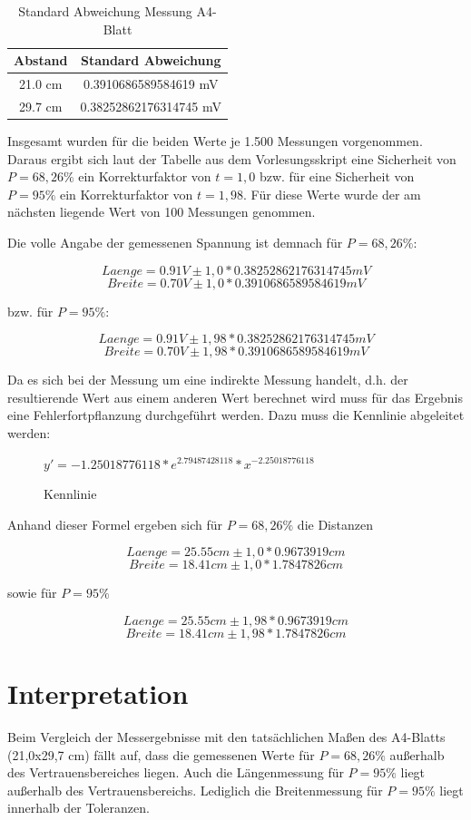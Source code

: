 \documentclass[12pt,oneside,a4paper]{report}
\begin{document}
\begin{table}[H]
	\centering\small
	\begin{tabular}{|c|c|}
		\hline
		Abstand & Standard Abweichung \\
		\hline
		21.0 cm & 0.3910686589584619 mV \\
		\hline
		29.7 cm & 0.38252862176314745 mV \\
		\hline
	\end{tabular}
	\caption{Standard Abweichung Messung A4-Blatt}
	\label{fig:VERSUCH_3_AUSWERTUNG_TABELLE}
\end{table}

Insgesamt wurden für die beiden Werte je 1.500 Messungen vorgenommen. Daraus ergibt sich laut der Tabelle aus dem Vorlesungsskript eine Sicherheit von \(P = 68,26\%\) ein Korrekturfaktor von \(t = 1,0\) bzw. für eine Sicherheit von \(P = 95\%\) ein Korrekturfaktor von \(t = 1,98\). Für diese Werte wurde der am nächsten liegende Wert von 100 Messungen genommen.

Die volle Angabe der gemessenen Spannung ist demnach für \(P = 68,26\%\):

\[Laenge = 0.91 V \pm 1,0 * 0.38252862176314745 mV\]
\[Breite = 0.70V \pm 1,0 * 0.3910686589584619 mV \]

bzw. für \(P = 95\%\):

\[Laenge = 0.91 V \pm 1,98 * 0.38252862176314745 mV\]
\[Breite = 0.70V \pm 1,98 * 0.3910686589584619 mV \]

Da es sich bei der Messung um eine indirekte Messung handelt, d.h. der resultierende Wert aus einem anderen Wert berechnet wird muss für das Ergebnis eine Fehlerfortpflanzung durchgeführt werden. Dazu muss die Kennlinie abgeleitet werden:

\begin{figure}[H]
	\centering\small
	\(y' = -1.25018776118 * e^{2.79487428118} * x^{-2.25018776118}\)
	\caption{Kennlinie}
	\label{fig:VERSUCH_3_AUSWERTUNG_KENNLINIE_STRICH}
\end{figure}

Anhand dieser Formel ergeben sich für \(P = 68,26\%\) die Distanzen

\[Laenge = 25.55 cm \pm 1,0 * 0.9673919 cm\]
\[Breite = 18.41 cm \pm 1,0 * 1.7847826 cm\]

sowie für \(P = 95\%\)

\[Laenge = 25.55 cm \pm 1,98 * 0.9673919 cm\]
\[Breite = 18.41 cm \pm 1,98 * 1.7847826 cm\]

\section{Interpretation}
\label{chap:VERSUCH_3_INTERPRETATION}
Beim Vergleich der Messergebnisse mit den tatsächlichen Maßen des A4-Blatts (21,0x29,7 cm) fällt auf, dass die gemessenen Werte für \(P = 68,26\%\) außerhalb des Vertrauensbereiches liegen. Auch die Längenmessung für \(P = 95\%\) liegt außerhalb des Vertrauensbereichs. Lediglich die Breitenmessung für \(P = 95\%\) liegt innerhalb der Toleranzen.
\end{document}
